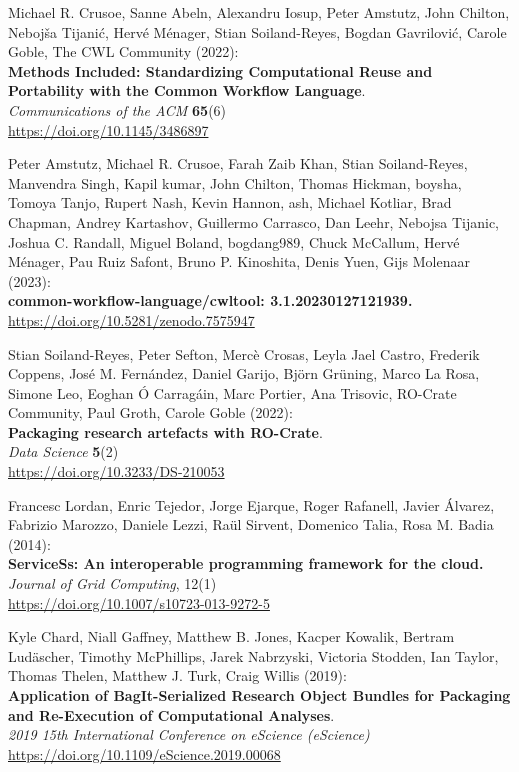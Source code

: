 \documentclass[10pt,letterpaper]{article}
\begin{document}
\begin{thebibliography}{10}
\begin{small}
Michael R. Crusoe, Sanne Abeln, Alexandru Iosup, Peter Amstutz, John Chilton, Nebojša Tijanić, Hervé Ménager, Stian Soiland-Reyes, Bogdan Gavrilović, Carole Goble, The CWL Community
(2022):\\
\textbf{Methods Included: Standardizing Computational Reuse and
Portability with the Common Workflow Language}.\\
\emph{Communications of the ACM} \textbf{65}(6)\\
\url{https://doi.org/10.1145/3486897}

Peter Amstutz, Michael R. Crusoe, Farah Zaib Khan, Stian Soiland-Reyes, Manvendra Singh, Kapil kumar, John Chilton, Thomas Hickman, boysha, Tomoya Tanjo, Rupert Nash, Kevin Hannon, ash, Michael Kotliar, Brad Chapman, Andrey Kartashov, Guillermo Carrasco, Dan Leehr, Nebojsa Tijanic, Joshua C. Randall, Miguel Boland, bogdang989, Chuck McCallum, Hervé Ménager, Pau Ruiz Safont, Bruno P. Kinoshita, Denis Yuen, Gijs Molenaar (2023):\\
\textbf{common-workflow-language/cwltool: 3.1.20230127121939.}\\
\url{https://doi.org/10.5281/zenodo.7575947}

Stian Soiland-Reyes, Peter Sefton, Mercè
Crosas, Leyla Jael Castro, Frederik Coppens, José M. Fernández, Daniel
Garijo, Björn Grüning, Marco La Rosa, Simone Leo, Eoghan Ó Carragáin,
Marc Portier, Ana Trisovic, RO-Crate Community, Paul Groth, Carole Goble
(2022):\\
\textbf{Packaging research artefacts with RO-Crate}.\\
\emph{Data Science} \textbf{5}(2)\\
\url{https://doi.org/10.3233/DS-210053}

 Francesc Lordan, Enric Tejedor, Jorge Ejarque, Roger
Rafanell, Javier Álvarez, Fabrizio Marozzo, Daniele Lezzi, Raül Sirvent,
Domenico Talia, Rosa M. Badia (2014):\\
\textbf{ServiceSs: An interoperable programming framework for the
cloud.}\\
\emph{Journal of Grid Computing}, 12(1)\\
\url{https://doi.org/10.1007/s10723-013-9272-5}


Kyle Chard, Niall Gaffney, Matthew B. Jones, Kacper
Kowalik, Bertram Ludäscher, Timothy McPhillips, Jarek Nabrzyski,
Victoria Stodden, Ian Taylor, Thomas Thelen, Matthew J. Turk, Craig
Willis (2019):\\
\textbf{Application of BagIt-Serialized Research Object Bundles for Packaging and Re-Execution of Computational Analyses}.\\
\emph{2019 15th International Conference on eScience (eScience)}\\
\url{https://doi.org/10.1109/eScience.2019.00068}


\end{small}
\end{thebibliography}
\end{document}
